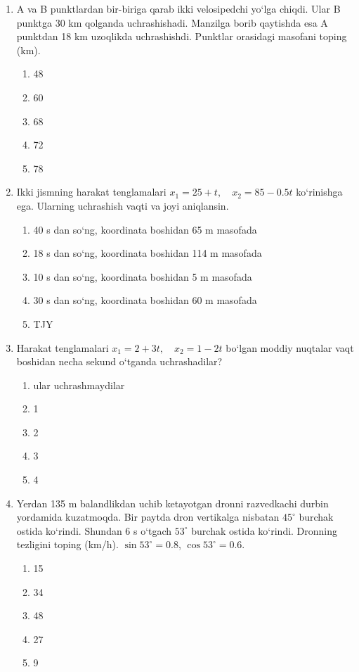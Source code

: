 \begin{enumerate}
\item A va B punktlardan bir-biriga qarab ikki velosipedchi yo‘lga chiqdi. 
Ular B punktga 30 km qolganda uchrashishadi. 
Manzilga borib qaytishda esa A punktdan 18 km uzoqlikda uchrashishdi. 
Punktlar orasidagi masofani toping (km).
\begin{enumerate}[label=\Alph*)]
\item 48
\item 60
\item 68
\item 72
\item 78
\end{enumerate}

\item Ikki jismning harakat tenglamalari $x_1 = 25 + t, \quad x_2 = 85 - 0.5t$ ko‘rinishga ega. Ularning uchrashish vaqti va joyi aniqlansin.
\begin{enumerate}[label=\Alph*)]
\item 40 s dan so‘ng, koordinata boshidan 65 m masofada
\item 18 s dan so‘ng, koordinata boshidan 114 m masofada
\item 10 s dan so‘ng, koordinata boshidan 5 m masofada
\item 30 s dan so‘ng, koordinata boshidan 60 m masofada
\item TJY
\end{enumerate}

\item Harakat tenglamalari $x_1 = 2 + 3t, \quad x_2 = 1 - 2t$ bo‘lgan moddiy nuqtalar vaqt boshidan necha sekund o‘tganda uchrashadilar?
\begin{enumerate}[label=\Alph*)]
\item ular uchrashmaydilar
\item 1
\item 2
\item 3
\item 4
\end{enumerate}

\item Yerdan 135 m balandlikdan uchib ketayotgan dronni razvedkachi durbin yordamida kuzatmoqda. 
Bir paytda dron vertikalga nisbatan $45^\circ$ burchak ostida ko‘rindi. 
Shundan 6 s o‘tgach $53^\circ$ burchak ostida ko‘rindi. 
Dronning tezligini toping (km/h). 
$\sin53^\circ=0.8$, $\cos53^\circ=0.6$.
\begin{enumerate}[label=\Alph*)]
\item 15
\item 34
\item 48
\item 27
\item 9
\end{enumerate}


\end{enumerate}
